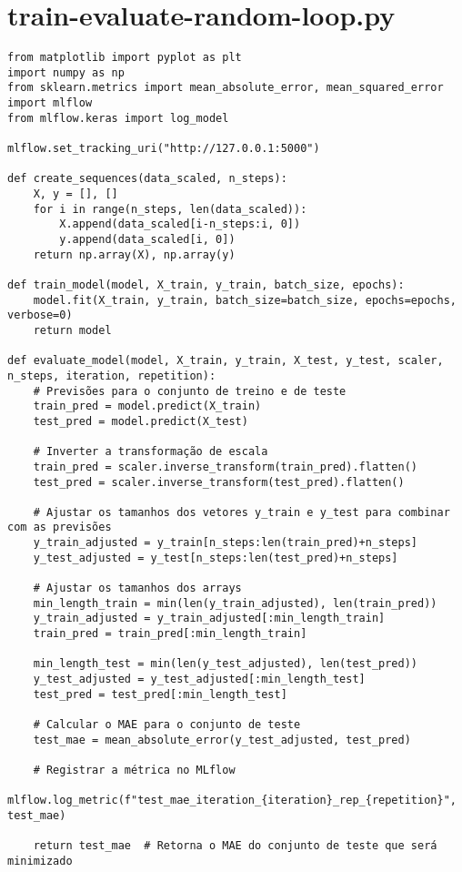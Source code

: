 \section{train-evaluate-random-loop.py}
\begin{lstlisting}
from matplotlib import pyplot as plt
import numpy as np
from sklearn.metrics import mean_absolute_error, mean_squared_error
import mlflow
from mlflow.keras import log_model

mlflow.set_tracking_uri("http://127.0.0.1:5000")

def create_sequences(data_scaled, n_steps):
    X, y = [], []
    for i in range(n_steps, len(data_scaled)):
        X.append(data_scaled[i-n_steps:i, 0])
        y.append(data_scaled[i, 0])
    return np.array(X), np.array(y)

def train_model(model, X_train, y_train, batch_size, epochs):
    model.fit(X_train, y_train, batch_size=batch_size, epochs=epochs, verbose=0)
    return model

def evaluate_model(model, X_train, y_train, X_test, y_test, scaler, n_steps, iteration, repetition):
    # Previsões para o conjunto de treino e de teste
    train_pred = model.predict(X_train)
    test_pred = model.predict(X_test)
    
    # Inverter a transformação de escala
    train_pred = scaler.inverse_transform(train_pred).flatten()
    test_pred = scaler.inverse_transform(test_pred).flatten()

    # Ajustar os tamanhos dos vetores y_train e y_test para combinar com as previsões
    y_train_adjusted = y_train[n_steps:len(train_pred)+n_steps]
    y_test_adjusted = y_test[n_steps:len(test_pred)+n_steps]

    # Ajustar os tamanhos dos arrays
    min_length_train = min(len(y_train_adjusted), len(train_pred))
    y_train_adjusted = y_train_adjusted[:min_length_train]
    train_pred = train_pred[:min_length_train]

    min_length_test = min(len(y_test_adjusted), len(test_pred))
    y_test_adjusted = y_test_adjusted[:min_length_test]
    test_pred = test_pred[:min_length_test]

    # Calcular o MAE para o conjunto de teste
    test_mae = mean_absolute_error(y_test_adjusted, test_pred)

    # Registrar a métrica no MLflow
    mlflow.log_metric(f"test_mae_iteration_{iteration}_rep_{repetition}", test_mae)

    return test_mae  # Retorna o MAE do conjunto de teste que será minimizado

\end{lstlisting}